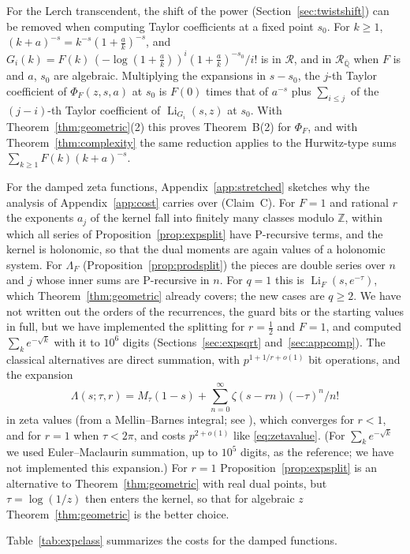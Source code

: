 \documentclass[11pt,reqno]{amsart}
\theoremstyle{definition}
\theoremstyle{remark}
\newcommand{\Li}{\operatorname{Li}}
\newcommand{\Qbar}{\overline{\mathbb{Q}}}
\newcommand{\Reg}{\mathcal{R}}
\newcommand{\RegQ}{\mathcal{R}_{\Qbar}}
\newcommand{\ZZ}{\mathbb{Z}}
\begin{document}
For the Lerch transcendent, the shift of the power (Section~\ref{sec:twistshift}) can be removed when computing
Taylor coefficients at a fixed point $s_0$. For $k \ge 1$,
$(k+a)^{-s} = k^{-s}(1+\frac ak)^{-s}$, and $G_i(k) = F(k)\,(-\log(1+\frac ak))^i(1+\frac ak)^{-s_0}/i!$ is in
$\Reg$, and in $\RegQ$ when $F$ is and $a$, $s_0$ are algebraic. Multiplying the expansions in $s - s_0$,
the $j$-th Taylor coefficient of $\Phi_F(z,s,a)$ at $s_0$ is $F(0)$ times that of $a^{-s}$ plus
$\sum_{i\le j}$ of the $(j-i)$-th Taylor coefficient of $\Li_{G_i}(s,z)$ at $s_0$. With
Theorem~\ref{thm:geometric}(2) this proves Theorem~B(2) for $\Phi_F$, and with Theorem~\ref{thm:complexity} the same
reduction applies to the Hurwitz-type sums $\sum_{k\ge1}F(k)(k+a)^{-s}$.

For the damped zeta functions, Appendix~\ref{app:stretched} sketches why the analysis of Appendix~\ref{app:cost}
carries over (Claim~C). For $F = 1$ and rational $r$ the exponents $a_j$ of the kernel fall into finitely many classes
modulo $\ZZ$, within which all series of Proposition~\ref{prop:expsplit} have P-recursive terms, and the kernel is
holonomic, so that the dual moments are again values of a holonomic system. For $\Lambda_F$
(Proposition~\ref{prop:prodsplit}) the pieces are double series over $n$ and $j$ whose inner sums are P-recursive in
$n$. For $q = 1$ this is $\Li_F(s,e^{-\tau})$, which Theorem~\ref{thm:geometric} already covers; the new cases are
$q \ge 2$. We have not written out the orders of the recurrences, the guard bits or the starting values in full,
but we have implemented the splitting for $r = \frac12$ and $F = 1$, and computed $\sum_ke^{-\sqrt k}$ with it to
$10^6$ digits (Sections~\ref{sec:expsqrt} and~\ref{sec:appcomp}).
The classical alternatives are direct summation, with $p^{1+1/r+o(1)}$ bit operations, and the expansion
\[
\Lambda(s;\tau,r) = M_\tau(1-s) + \sum_{n=0}^{\infty}\zeta(s-rn)(-\tau)^n/n!
\]
in zeta values (from a
Mellin--Barnes integral; see \cite{Joh26}), which converges for $r < 1$, and for $r = 1$ when $\tau < 2\pi$, and costs
$p^{2+o(1)}$ like \eqref{eq:zetavalue}. (For $\sum_ke^{-\sqrt k}$ we used Euler--Maclaurin summation, up to $10^5$
digits, as the reference; we have not implemented this expansion.) For $r = 1$ Proposition~\ref{prop:expsplit} is an alternative to
Theorem~\ref{thm:geometric} with real dual points, but $\tau = \log(1/z)$ then enters the kernel, so that for algebraic
$z$ Theorem~\ref{thm:geometric} is the better choice.

Table~\ref{tab:expclass} summarizes the costs for the damped functions.
\end{document}

